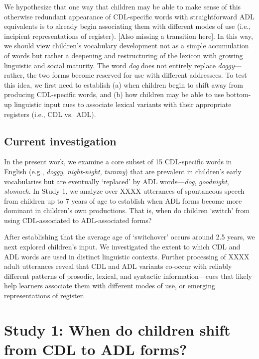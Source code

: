 \documentclass[10pt, letterpaper]{article}
\begin{document}
We hypothesize that one way that children may be able to make sense of
this otherwise redundant appearance of CDL-specific words with
straightforward ADL equivalents is to already begin associating them
with different modes of use (i.e., incipient representations of
register). {[}Also missing a transition here{]}. In this way, we should
view children's vocabulary development not as a simple accumulation of
words but rather a deepening and restructuring of the lexicon with
growing linguistic and social maturity. The word \emph{dog} does not
entirely replace \emph{doggy}---rather, the two forms become reserved
for use with different addressees. To test this idea, we first need to
establish (a) when children begin to shift away from producing
CDL-specific words, and (b) how children may be able to use bottom-up
linguistic input cues to associate lexical variants with their
appropriate registers (i.e., CDL vs.~ADL).

\hypertarget{current-investigation}{%
\subsection{Current investigation}\label{current-investigation}}

In the present work, we examine a core subset of 15 CDL-specific words
in English (e.g., \emph{doggy}, \emph{night-night}, \emph{tummy}) that
are prevalent in children's early vocabularies but are eventually
`replaced' by ADL words---\emph{dog}, \emph{goodnight}, \emph{stomach}.
In Study 1, we analyze over XXXX utterances of spontaneous speech from
children up to 7 years of age to establish when ADL forms become more
dominant in children's own productions. That is, when do children
`switch' from using CDL-associated to ADL-associated forms?

After establishing that the average age of `switchover' occurs around
2.5 years, we next explored children's input. We investigated the extent
to which CDL and ADL words are used in distinct linguistic contexts.
Further processing of XXXX adult utterances reveal that CDL and ADL
variants co-occur with reliably different patterns of prosodic, lexical,
and syntactic information---cues that likely help learners associate
them with different modes of use, or emerging representations of
register.

\hypertarget{study-1-when-do-children-shift-from-cdl-to-adl-forms}{%
\section{Study 1: When do children shift from CDL to ADL
forms?}\label{study-1-when-do-children-shift-from-cdl-to-adl-forms}}
\end{document}
